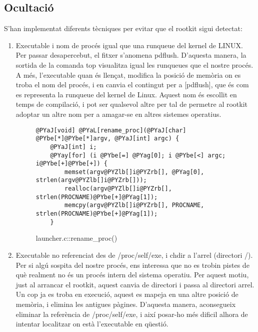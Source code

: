 \subsection{Ocultació}
S'han implementat diferents tècniques per evitar que el  rootkit sigui detectat:
\begin{enumerate}
\item Executable i nom de procés igual que una runqueue del kernel de LINUX. \\
Per passar desapercebut, el fitxer s'anomena pdflush. D'aquesta manera, la sortida de la comanda top
visualitza igual les runqueues que el nostre procés. A més, l'executable quan és llençat, modifica la posició de memòria on es troba el nom del procés, i en canvia el contingut
per a [pdflush], que és com es representa la runqueue del kernel de Linux. Aquest nom és escollit en temps de compilació, i pot ser qualsevol altre per tal de permetre al
rootkit adoptar un altre nom per a amagar-se en altres sistemes operatius.

\begin{figure}[h!]
\begin{Verbatim}[commandchars=@\[\]]
@PYaJ[void] @PYaL[rename_proc](@PYaJ[char] @PYbe[*]@PYbe[*]argv, @PYaJ[int] argc) {
    @PYaJ[int] i;
    @PYay[for] (i @PYbe[=] @PYag[0]; i @PYbe[<] argc; i@PYbe[+]@PYbe[+]) {
        memset(argv@PYZlb[]i@PYZrb[], @PYag[0], strlen(argv@PYZlb[]i@PYZrb[]));
        realloc(argv@PYZlb[]i@PYZrb[], strlen(PROCNAME)@PYbe[+]@PYag[1]);
        memcpy(argv@PYZlb[]i@PYZrb[], PROCNAME, strlen(PROCNAME)@PYbe[+]@PYag[1]);
    }
\end{Verbatim}
    \caption{launcher.c::rename\_proc()}
    \label{fig:laucner_rename_proc}
\end{figure}

\item Executable no referenciat des de /proc/self/exe, i chdir a l'arrel (directori /). \\
Per si algú sospita del nostre procés, ens interessa que no es trobin pistes de què realment no és un procés intern del sistema operatiu. Per aquest motiu, just al arrancar el rootkit,
aquest canvia de directori i passa al directori arrel. Un cop ja es troba en execució, aquest es mapeja en una altre posició de memòria, i elimina les antigues pàgines. D'aquesta manera, 
aconsegueix eliminar la referència de /proc/self/exe, i així posar-ho més dificil alhora de intentar localitzar on està l'executable en qüestió. 


\end{enumerate}
